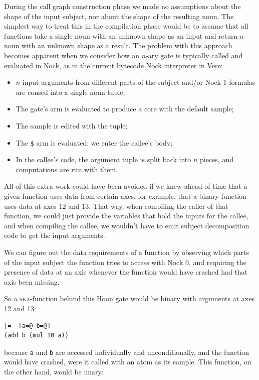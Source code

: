 \documentclass[twoside]{article}
\begin{document}
During the call graph construction phase we made no assumptions about the shape of the input subject, nor about the shape of the resulting noun. The simplest way to treat this in the compilation phase would be to assume that all functions take a single noun with an unknown shape as an input and return a noun with an unknown shape as a result. The problem with this approach becomes apparent when we consider how an $n$-ary gate is typically called and evaluated in Nock, as in the current bytecode Nock interpreter in Vere:
\begin{itemize}
  \item  $n$ input arguments from different parts of the subject and/or Nock 1 formulas are consed into a single noun tuple;
  \item  The gate's arm is evaluated to produce a core with the default sample;
  \item  The sample is edited with the tuple;
  \item  The \lstinline[style=inlinecode]{$} arm is evaluated: we enter the callee's body;
  \item  In the callee's code, the argument tuple is split back into $n$ pieces, and computations are run with them.
\end{itemize}

All of this extra work could have been avoided if we knew ahead of time that a given function uses data from certain axes, for example, that a binary function uses data at axes 12 and 13. That way, when compiling the caller of that function, we could just provide the variables that hold the inputs for the callee, and when compiling the callee, we wouldn't have to emit subject decomposition code to get the input arguments.

We can figure out the data requirements of a function by observing which parts of the input subject the function tries to access with Nock 0, and requiring the presence of data at an axis whenever the function would have crashed had that axis been missing.

So a \textsc{ska}-function behind this Hoon gate would be binary with arguments at axes 12 and 13:

\begin{lstlisting}[style=listingblock]
|=  [a=@ b=@]
(add b (mul 10 a))
\end{lstlisting}

because \texttt{a} and \texttt{b} are accessed individually and unconditionally, and the function would have crashed, were it called with an atom as its sample. This function, on the other hand, would be unary:
\end{document}
